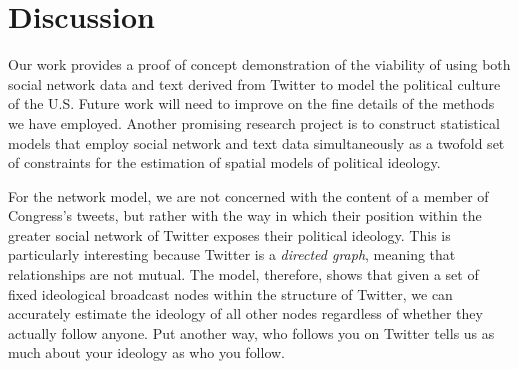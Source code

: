 \documentclass[10pt]{article}
\begin{document}
\section{Discussion}
Our work provides a proof of concept demonstration of the viability of using both social network data and text derived from Twitter to model the political culture of the U.S. Future work will need to improve on the fine details of the methods we have employed. Another promising research project is to construct statistical models that employ social network and text data simultaneously as a twofold set of constraints for the estimation of spatial models of political ideology.

For the network model, we are not concerned with the content of a member of Congress's tweets, but rather with the way in which their position within the greater social network of Twitter exposes their political ideology.  This is particularly interesting because Twitter is a \emph{directed graph}, meaning that relationships are not mutual.  The model, therefore, shows that given a set of fixed ideological broadcast nodes within the structure of Twitter, we can accurately estimate the ideology of all other nodes regardless of whether they actually follow anyone.  Put another way, who follows you on Twitter tells us as much about your ideology as who you follow.


 
\end{document}
